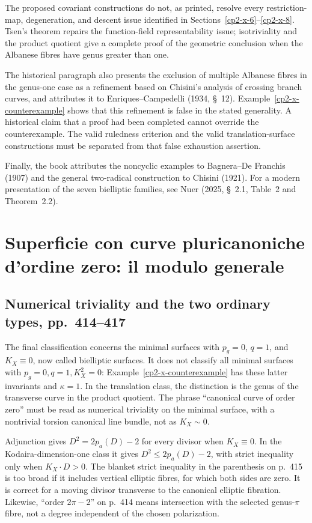 The proposed covariant constructions do not, as printed, resolve every restriction-map, degeneration, and descent issue identified in Sections~\ref{cp2-x-6}--\ref{cp2-x-8}. Tsen's theorem repairs the function-field representability issue; isotriviality and the product quotient give a complete proof of the geometric conclusion when the Albanese fibres have genus greater than one.

The historical paragraph also presents the exclusion of multiple Albanese fibres in the genus-one case as a refinement based on Chisini's analysis of crossing branch curves, and attributes it to Enriques--Campedelli (1934, \S~12). Example~\ref{cp2-x-counterexample} shows that this refinement is false in the stated generality. A historical claim that a proof had been completed cannot override the counterexample. The valid ruledness criterion and the valid translation-surface constructions must be separated from that false exhaustion assertion.

Finally, the book attributes the noncyclic examples to Bagnera--De Franchis (1907) and the general two-radical construction to Chisini (1921). For a modern presentation of the seven bielliptic families, see Nuer (2025, \S~2.1, Table~2 and Theorem~2.2).

\section{Superficie con curve pluricanoniche d'ordine zero: il modulo generale}
\label{cp2-x-16}

\subsection{Numerical triviality and the two ordinary types, pp.~414--417}

The final classification concerns the minimal surfaces with $p_g=0$, $q=1$, and $K_X\equiv0$, now called bielliptic surfaces. It does not classify all minimal surfaces with $p_g=0,q=1,K_X^2=0$: Example~\ref{cp2-x-counterexample} has these latter invariants and $\kappa=1$. In the translation class, the distinction is the genus of the transverse curve in the product quotient. The phrase ``canonical curve of order zero'' must be read as numerical triviality on the minimal surface, with a nontrivial torsion canonical line bundle, not as $K_X\sim0$.

Adjunction gives $D^2=2p_a(D)-2$ for every divisor when $K_X\equiv0$. In the Kodaira-dimension-one class it gives $D^2\leq2p_a(D)-2$, with strict inequality only when $K_X\cdot D>0$. The blanket strict inequality in the parenthesis on p.~415 is too broad if it includes vertical elliptic fibres, for which both sides are zero. It is correct for a moving divisor transverse to the canonical elliptic fibration. Likewise, ``order $2\pi-2$'' on p.~414 means intersection with the selected genus-$\pi$ fibre, not a degree independent of the chosen polarization.

